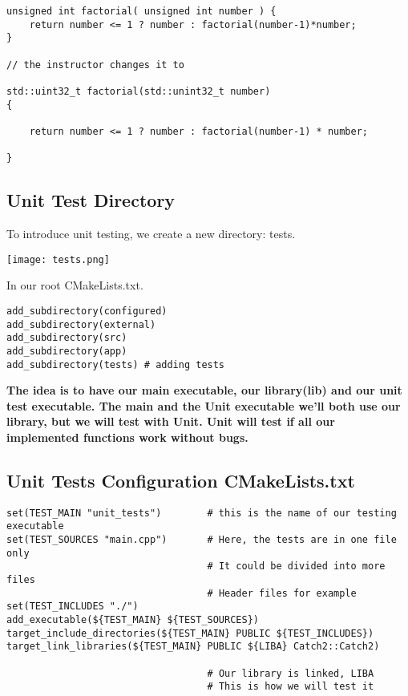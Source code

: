 \begin{verbatim}
unsigned int factorial( unsigned int number ) {
    return number <= 1 ? number : factorial(number-1)*number;
}

// the instructor changes it to

std::uint32_t factorial(std::unint32_t number)
{

    return number <= 1 ? number : factorial(number-1) * number;

}
\end{verbatim}


\subsection{Unit Test Directory}

To introduce unit testing, we create a new directory: tests.

\begin{center}
    \texttt{[image: tests.png]}
\end{center}

In our root CMakeLists.txt.  

\begin{verbatim}
add_subdirectory(configured)
add_subdirectory(external)
add_subdirectory(src)
add_subdirectory(app)
add_subdirectory(tests) # adding tests
\end{verbatim}

\textbf{The idea is to have our main executable, our library(lib) and our unit test executable. The main and the Unit
executable we'll both use our library, but we will test with Unit. Unit will test if all our implemented functions work without bugs.}


\subsection{Unit Tests Configuration CMakeLists.txt}

\begin{verbatim}
set(TEST_MAIN "unit_tests")        # this is the name of our testing executable
set(TEST_SOURCES "main.cpp")       # Here, the tests are in one file only
                                   # It could be divided into more files
                                   # Header files for example
set(TEST_INCLUDES "./")
add_executable(${TEST_MAIN} ${TEST_SOURCES})
target_include_directories(${TEST_MAIN} PUBLIC ${TEST_INCLUDES})
target_link_libraries(${TEST_MAIN} PUBLIC ${LIBA} Catch2::Catch2)

                                   # Our library is linked, LIBA
                                   # This is how we will test it
\end{verbatim}


